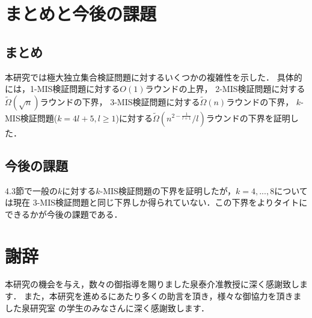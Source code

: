 \documentclass[12pt]{thesis}
\theoremstyle{definition}
\begin{document}
\chapter{まとめと今後の課題}
\section{まとめ}
本研究では極大独立集合検証問題に対するいくつかの複雑性を示した．
具体的には，1-MIS検証問題に対する$O(1)$ラウンドの上界，
2-MIS検証問題に対する$\tilde{\Omega} (\sqrt{n})$ラウンドの下界，
3-MIS検証問題に対する$\tilde{\Omega} (n)$ラウンドの下界，
$k$-MIS検証問題($k = 4l + 5, l \geq 1$)に対する$\tilde{\Omega}\left(n^{2 - \frac{1}{l + 1}}/l\right)$ラウンドの下界を証明した．

\section{今後の課題}
4.3節で一般の$k$に対する$k$-MIS検証問題の下界を証明したが，$k = 4,...,8$については現在
3-MIS検証問題と同じ下界しか得られていない．この下界をよりタイトにできるかが今後の課題である．
\newpage

\chapter*{謝辞}
本研究の機会を与え，数々の御指導を賜りました泉泰介准教授に深く感謝致します．
また，本研究を進めるにあたり多くの助言を頂き，様々な御協力を頂きました泉研究室
の学生のみなさんに深く感謝致します．

\newpage


\end{document}
